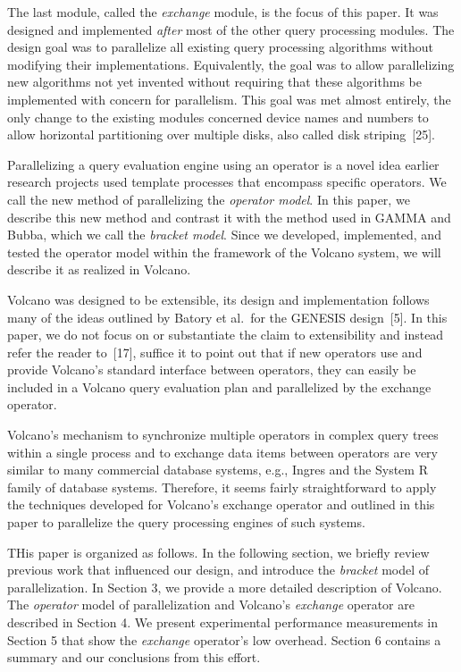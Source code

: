 \documentclass[a4paper,12pt,notitlepage,twoside,openright]{article}
\begin{document}
The last module, called the \emph{exchange} module, is the
focus of this paper. It was designed and implemented \emph{after}
most of the other query processing modules. The design
goal was to parallelize all existing query processing algorithms
without modifying their implementations.
Equivalently, the goal was to allow parallelizing new algorithms
not yet invented without requiring that these algorithms
be implemented with concern for parallelism. This
goal was met almost entirely, the only change to the existing
modules concerned device names and numbers to allow
horizontal partitioning over multiple disks, also called disk
striping~{[25]}.

Parallelizing a query evaluation engine using an
operator is a novel idea earlier research projects used
template processes that encompass specific operators. We
call the new method of parallelizing the \emph{operator model}. In
this paper, we describe this new method and contrast it
with the method used in GAMMA and Bubba, which we
call the \emph{bracket model}. Since we developed, implemented,
and tested the operator model within the framework of the
Volcano system, we will describe it as realized in Volcano.

Volcano was designed to be extensible, its design and
implementation follows many of the ideas outlined by
Batory et al.\ for the GENESIS design~{[5]}. In this paper,
we do not focus on or substantiate the claim to extensibility
and instead refer the reader to~{[17]}, suffice it to point out
that if new operators use and provide Volcano's standard
interface between operators, they can easily be included in a
Volcano query evaluation plan and parallelized by the
exchange operator.

Volcano's mechanism to synchronize multiple operators
in complex query trees within a single process and to
exchange data items between operators are very similar to
many commercial database systems, e.g., Ingres and the
System R family of database systems. Therefore, it seems
fairly straightforward to apply the techniques developed for
Volcano's exchange operator and outlined in this paper to
parallelize the query processing engines of such systems.

THis paper is organized as follows. In the following
section, we briefly review previous work that influenced our
design, and introduce the \emph{bracket} model of parallelization.
In Section 3, we provide a more detailed description of
Volcano. The \emph{operator} model of parallelization and
Volcano's \emph{exchange} operator are described in Section 4.
We present experimental performance measurements in Section 5
that show the \emph{exchange} operator's low overhead.
Section 6 contains a summary and our conclusions from this effort.
\end{document}
